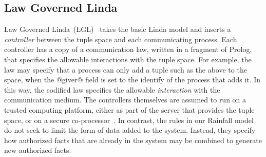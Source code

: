 



\subsection{Law Governed Linda}
Law Governed Linda~(LGL)~\cite{Minsky1994:LawGovernedLinda, Minsky2001:SafeTupleSpace} takes the basic Linda model and inserts a \emph{controller} between the tuple space and each communicating process. Each controller has a copy of a communication law, written in a fragment of Prolog, that specifies the allowable interactions with the tuple space. For example, the law may specify that a process can only add a tuple such as the above to the space, when the @giver@ field is set to the identify of the process that adds it. In this way, the codified law specifies the allowable \emph{interaction} with the communication medium. The controllers themselves are assumed to run on a trusted computing platform, either as part of the server that provides the tuple space, or on a secure co-processor~\cite{Minsky2001:SafeTupleSpace}. In contrast, the rules in our Rainfall model do not seek to limit the form of data added to the system. Instead, they specify how authorized facts that are already in the system may be combined to generate new authorized facts.



